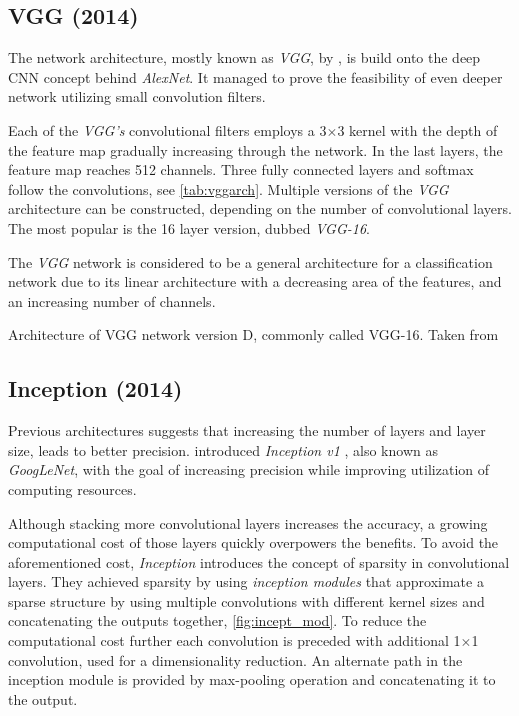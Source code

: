 \subsection{VGG (2014)}
\label{sec:VGG}
The network architecture, mostly known as \textit{VGG}, by \citeauthor{bib:vgg} \cite{bib:vgg}, is build onto the deep CNN concept behind \textit{AlexNet}. It managed to prove the feasibility of even deeper network utilizing small convolution filters. 

Each of the \textit{VGG's} convolutional filters employs a 3$\times$3 kernel with the depth of the feature map gradually increasing through the network. In the last layers, the feature map reaches 512 channels. Three fully connected layers and softmax follow the convolutions, see \cref{tab:vggarch}. Multiple versions of the \textit{VGG} architecture can be constructed, depending on the number of convolutional layers. The most popular is the 16 layer version, dubbed \textit{VGG-16}.

The \textit{VGG} network is considered to be a general architecture for a classification network due to its linear architecture with a decreasing area of the features, and an increasing number of channels. 

\begin{table}
    \centering
    \caption{Architecture of VGG network version D, commonly called VGG-16. Taken from \cite[table 1]{bib:vgg}}
    \label{tab:vggarch}
\end{table}
    
\subsection{Inception (2014)}
\label{sec:inception}
Previous architectures suggests that increasing the number of layers and layer size, leads to better precision. \citeauthor{bib:googlenet} introduced \textit{Inception v1} \cite{bib:googlenet}, also known as \textit{GoogLeNet}, with the goal of increasing precision while improving utilization of computing resources.

Although stacking more convolutional layers increases the accuracy, a growing computational cost of those layers quickly overpowers the benefits. To avoid the aforementioned cost, \textit{Inception} introduces the concept of sparsity in convolutional layers. They achieved sparsity by using \textit{inception modules} that approximate a sparse structure by using multiple convolutions with different kernel sizes and concatenating the outputs together, \cref{fig:incept_mod}. To reduce the computational cost further each convolution is preceded with additional 1$\times$1 convolution, used for a dimensionality reduction. An alternate path in the inception module is provided by max-pooling operation and concatenating it to the output.

